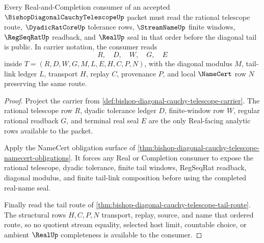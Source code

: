 \begin{theorem}
\label{thm:bishop-diagonal-cauchy-telescope-regseqrat-route}
Every Real-and-Completion consumer of an accepted $\BishopDiagonalCauchyTelescopeUp$ packet must read the rational telescope route, $\DyadicRatCoreUp$ tolerance rows, $\StreamNameUp$ finite windows, $\RegSeqRatUp$ readback, and $\RealUp$ seal in that order before the diagonal tail is public. In carrier notation, the consumer reads
$$
R,\quad D,\quad W,\quad G,\quad E
$$
inside $T=(R,D,W,G,M,L,E,H,C,P,N)$, with the diagonal modulus $M$, tail-link ledger $L$, transport $H$, replay $C$, provenance $P$, and local $\NameCert$ row $N$ preserving the same route.
\end{theorem}
\begin{proof}
Project the carrier from \autoref{def:bishop-diagonal-cauchy-telescope-carrier}. The rational telescope row $R$, dyadic tolerance ledger $D$, finite-window row $W$, regular rational readback $G$, and terminal real seal $E$ are the only Real-facing analytic rows available to the packet.

Apply the NameCert obligation surface of \autoref{thm:bishop-diagonal-cauchy-telescope-namecert-obligations}. It forces any Real or Completion consumer to expose the rational telescope, dyadic tolerance, finite tail windows, RegSeqRat readback, diagonal modulus, and finite tail-link composition before using the completed real-name seal.

Finally read the tail route of \autoref{thm:bishop-diagonal-cauchy-telescope-tail-route}. The structural rows $H,C,P,N$ transport, replay, source, and name that ordered route, so no quotient stream equality, selected host limit, countable choice, or ambient $\RealUp$ completeness is available to the consumer.
\end{proof}
